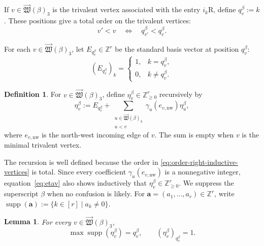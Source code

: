 \documentclass[12pt, reqno]{amsart}
\theoremstyle{plain}
\newtheorem{lemma}[theorem]{Lemma}
\theoremstyle{definition}
\newtheorem{definition}[theorem]{Definition}
\numberwithin{equation}{section}
\newcommand{\ZZ}{\mathbb{Z}}
\begin{document}
If \(v\in\overrightarrow{\mathfrak W}(\beta)_3\) is the
trivalent vertex associated with the entry \(i_k\mathrm R\), define
\(q_v^\beta:=k\). These positions give a total order on the trivalent
vertices:
\begin{equation}\label{eq:order-right-inductive-vertices}
    v'<v
    \quad\Longleftrightarrow\quad
    q_{v'}^\beta<q_v^\beta.
\end{equation}

For each
\(v\in\overrightarrow{\mathfrak W}(\beta)_3\), let
\(E_{q_v^\beta}\in\ZZ^r\) be the standard basis vector at position \(q_v^\beta\):
\begin{equation}\label{eq:standard-vector-Ev}
    (E_{q_v^\beta})_k=
    \begin{cases}
        1,&k=q_v^\beta,\\
        0,&k\neq q_v^\beta.
    \end{cases}
\end{equation}

\begin{definition}\label{def:eta-vector-right-inductive}
    For \(v\in\overrightarrow{\mathfrak W}(\beta)_3\), define
    \(\eta_v^\beta\in\ZZ_{\geq0}^r\) recursively by
    \begin{equation}\label{eq:etav}
        \eta_v^\beta
        :=E_{q_v^\beta}+
        \sum_{\substack{
            u\in\overrightarrow{\mathfrak W}(\beta)_3\\
            u<v
        }}
        \gamma_u(e_{v,\mathrm{nw}})\eta_u^\beta,
    \end{equation}
    where \(e_{v,\mathrm{nw}}\) is the north-west incoming edge of
    \(v\). The sum is empty when \(v\) is the minimal trivalent
    vertex.
\end{definition}

The recursion is well defined because the order in
\eqref{eq:order-right-inductive-vertices} is total. Since every
coefficient \(\gamma_u(e_{v,\mathrm{nw}})\) is a nonnegative integer,
equation~\eqref{eq:etav} also shows inductively that
\(\eta_v^\beta\in\ZZ_{\geq0}^r\). We suppress the superscript
\(\beta\) when no confusion is likely. For \(\mathbf a=(a_1,\ldots,a_r)\in\ZZ^r\), write
\(\operatorname{supp}(\mathbf a):=\{k\in[r]\mid a_k\neq0\}\).

\begin{lemma}\label{lem:maxindex}
    For every \(v\in\overrightarrow{\mathfrak W}(\beta)_3\),
    \begin{equation}\label{eq:maximal-support-eta}
        \max\operatorname{supp}(\eta_v^\beta)=q_v^\beta,
        \qquad
        (\eta_v^\beta)_{q_v^\beta}=1.
    \end{equation}
\end{lemma}
\end{document}
